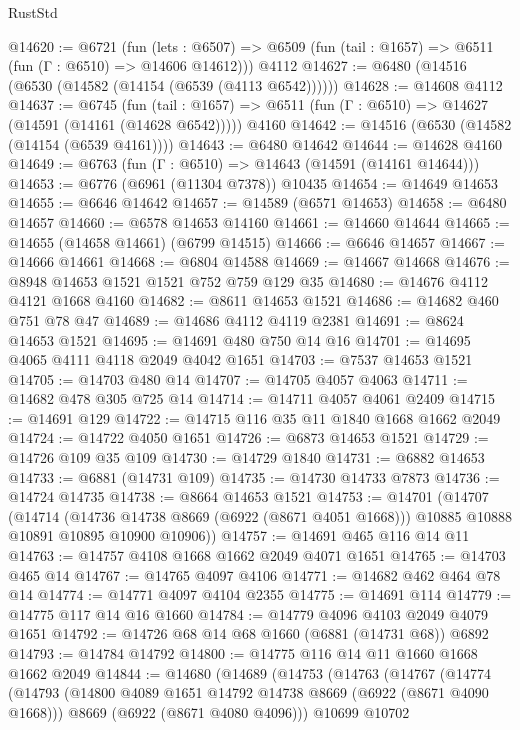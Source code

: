\begin{lexlean}{RustStd}
\begin{coremodule}
@14620 := @6721
    (fun (lets : @6507) => @6509 (fun (tail : @1657) => @6511 (fun (Γ : @6510) => @14606 @14612)))
    @4112
@14627 := @6480 (@14516 (@6530 (@14582 (@14154 (@6539 (@4113 @6542))))))
@14628 := @14608 @4112
@14637 := @6745
    (fun (tail : @1657) => @6511 (fun (Γ : @6510) => @14627 (@14591 (@14161 (@14628 @6542)))))
    @4160
@14642 := @14516 (@6530 (@14582 (@14154 (@6539 @4161))))
@14643 := @6480 @14642
@14644 := @14628 @4160
@14649 := @6763 (fun (Γ : @6510) => @14643 (@14591 (@14161 @14644)))
@14653 := @6776 (@6961 (@11304 @7378)) @10435
@14654 := @14649 @14653
@14655 := @6646 @14642
@14657 := @14589 (@6571 @14653)
@14658 := @6480 @14657
@14660 := @6578 @14653 @14160
@14661 := @14660 @14644
@14665 := @14655 (@14658 @14661) (@6799 @14515)
@14666 := @6646 @14657
@14667 := @14666 @14661
@14668 := @6804 @14588
@14669 := @14667 @14668
@14676 := @8948 @14653 @1521 @1521 @752 @759 @129 @35
@14680 := @14676 @4112 @4121 @1668 @4160
@14682 := @8611 @14653 @1521
@14686 := @14682 @460 @751 @78 @47
@14689 := @14686 @4112 @4119 @2381
@14691 := @8624 @14653 @1521
@14695 := @14691 @480 @750 @14 @16
@14701 := @14695 @4065 @4111 @4118 @2049 @4042 @1651
@14703 := @7537 @14653 @1521
@14705 := @14703 @480 @14
@14707 := @14705 @4057 @4063
@14711 := @14682 @478 @305 @725 @14
@14714 := @14711 @4057 @4061 @2409
@14715 := @14691 @129
@14722 := @14715 @116 @35 @11 @1840 @1668 @1662 @2049
@14724 := @14722 @4050 @1651
@14726 := @6873 @14653 @1521
@14729 := @14726 @109 @35 @109
@14730 := @14729 @1840
@14731 := @6882 @14653
@14733 := @6881 (@14731 @109)
@14735 := @14730 @14733 @7873
@14736 := @14724 @14735
@14738 := @8664 @14653 @1521
@14753 := @14701
    (@14707
      (@14714
        (@14736 @14738 @8669 (@6922 (@8671 @4051 @1668)))
        @10885
        @10888
        @10891
        @10895
        @10900
        @10906))
@14757 := @14691 @465 @116 @14 @11
@14763 := @14757 @4108 @1668 @1662 @2049 @4071 @1651
@14765 := @14703 @465 @14
@14767 := @14765 @4097 @4106
@14771 := @14682 @462 @464 @78 @14
@14774 := @14771 @4097 @4104 @2355
@14775 := @14691 @114
@14779 := @14775 @117 @14 @16 @1660
@14784 := @14779 @4096 @4103 @2049 @4079 @1651
@14792 := @14726 @68 @14 @68 @1660 (@6881 (@14731 @68)) @6892
@14793 := @14784 @14792
@14800 := @14775 @116 @14 @11 @1660 @1668 @1662 @2049
@14844 := @14680
    (@14689
      (@14753
        (@14763
          (@14767
            (@14774
              (@14793
                (@14800 @4089 @1651 @14792 @14738 @8669 (@6922 (@8671 @4090 @1668)))
                @8669
                (@6922 (@8671 @4080 @4096)))
              @10699
              @10702

\end{coremodule}
\end{lexlean}
